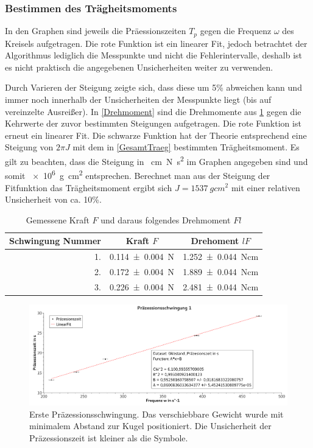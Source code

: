 \documentclass[
	a4paper,
	12pt,
	pagesize,
	ngerman
]{scrartcl}
\begin{document}
	\subsubsection*{Bestimmen des Trägheitsmoments}
	In den Graphen  sind jeweils die Präessionszeiten $T_p$ gegen die Frequenz $\omega$ des Kreisels aufgetragen. Die rote Funktion ist ein linearer Fit, jedoch betrachtet der Algorithmus lediglich die Messpunkte und nicht die Fehlerintervalle, deshalb ist es nicht praktisch die angegebenen Unsicherheiten weiter zu verwenden. 

	Durch Varieren der Steigung zeigte sich, dass diese um 5\% abweichen kann und immer noch innerhalb der Unsicherheiten der Messpunkte liegt (bis auf vereinzelte Ausreißer).
	In \cref{Drehmoment} sind die Drehmomente aus \cref{Tabelle_Kraft} gegen die Kehrwerte der zuvor bestimmten Steigungen aufgetragen. 
	Die rote Funktion ist erneut ein linearer Fit. 
	Die schwarze Funktion hat der Theorie entsprechend eine Steigung von $2\pi J$ mit dem in \cref{GesamtTraeg} bestimmten Trägheitsmoment.
	Es gilt zu beachten, dass die Steigung in \SI{}{cm N s^2} im Graphen angegeben sind und somit \SI{e6}{g cm^2} entsprechen. 
	Berechnet man aus der Steigung der Fitfunktion das Trägheitsmoment ergibt sich $J = \SI{1537}{g cm^2}$ mit einer relativen Unsicherheit von ca. 10\%.

	\begin{table}[tb]
		\centering
		\begin{tabular}{ r | c | c}
			Schwingung Nummer& Kraft $F$ & Drehoment $lF$\\ \hline
			1.& \SI{0,114 \pm 0,004 }{N}& \SI{1,252 \pm 0,044}{Ncm} \\
			2.& \SI{0,172 \pm 0,004 }{N}& \SI{1,889 \pm 0,044}{Ncm} \\
			3.& \SI{0,226 \pm 0,004 }{N}& \SI{2,481 \pm 0,044}{Ncm} \\
		\end{tabular}
		\caption{Gemessene Kraft $F$ und daraus folgendes Drehmoment $Fl$}
		\label{Tabelle_Kraft} 
	\end{table}

	\begin{figure}[tb]
		\includegraphics[width=1\textwidth]{Praez1}
		\centering
		\caption{Erste Präzessionsschwingung. Das verschiebbare Gewicht wurde mit minimalem Abstand zur Kugel positioniert. Die Unsicherheit der Präzessionszeit ist kleiner als die Symbole.} %
		\label{Praez1}
		\centering
	\end{figure}
\end{document}
